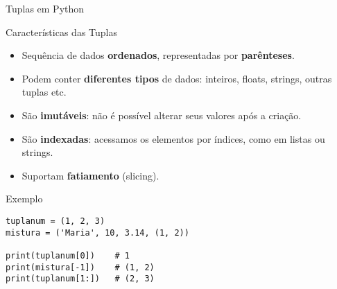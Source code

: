 \begin{frame}[fragile]{Tuplas em Python}

\begin{block}{Características das Tuplas}
\begin{itemize}
    \item Sequência de dados \textbf{ordenados}, representadas por \textbf{parênteses}.
    \item Podem conter \textbf{diferentes tipos} de dados: inteiros, floats, strings, outras tuplas etc.
    \item São \textbf{imutáveis}: não é possível alterar seus valores após a criação.
    \item São \textbf{indexadas}: acessamos os elementos por índices, como em listas ou strings.
    \item Suportam \textbf{fatiamento} (slicing).
\end{itemize}
\end{block}

\vspace{0.5em}

\begin{block}{Exemplo}
\begin{verbatim}
tuplanum = (1, 2, 3)
mistura = ('Maria', 10, 3.14, (1, 2))

print(tuplanum[0])    # 1
print(mistura[-1])    # (1, 2)
print(tuplanum[1:])   # (2, 3)
\end{verbatim}
\end{block}

\end{frame}


